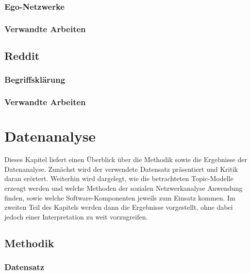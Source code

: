 \documentclass[11pt,a4paper,twoside]{article}
\begin{document}
\hypertarget{ego-netzwerke}{%
\subsubsection{Ego-Netzwerke}\label{ego-netzwerke}}

\hypertarget{verwandte-arbeiten-1}{%
\subsubsection{Verwandte Arbeiten}\label{verwandte-arbeiten-1}}

\hypertarget{reddit}{%
\subsection{Reddit}\label{reddit}}

\hypertarget{begriffsklarung}{%
\subsubsection{Begriffsklärung}\label{begriffsklarung}}

\hypertarget{verwandte-arbeiten-2}{%
\subsubsection{Verwandte Arbeiten}\label{verwandte-arbeiten-2}}

\cleardoublepage

\hypertarget{datenanalyse}{%
\section{Datenanalyse}\label{datenanalyse}}

Dieses Kapitel liefert einen Überblick über die Methodik sowie die
Ergebnisse der Datenanalyse. Zunächst wird der verwendete Datensatz
präsentiert und Kritik daran erörtert. Weiterhin wird dargelegt, wie die
betrachteten Topic-Modelle erzeugt werden und welche Methoden der
sozialen Netzwerkanalyse Anwendung finden, sowie welche
Software-Komponenten jeweils zum Einsatz kommen. Im zweiten Teil des
Kapitels werden dann die Ergebnisse vorgestellt, ohne dabei jedoch einer
Interpretation zu weit vorzugreifen.

\hypertarget{methodik}{%
\subsection{Methodik}\label{methodik}}

\hypertarget{datensatz}{%
\subsubsection{Datensatz}\label{datensatz}}
\end{document}
